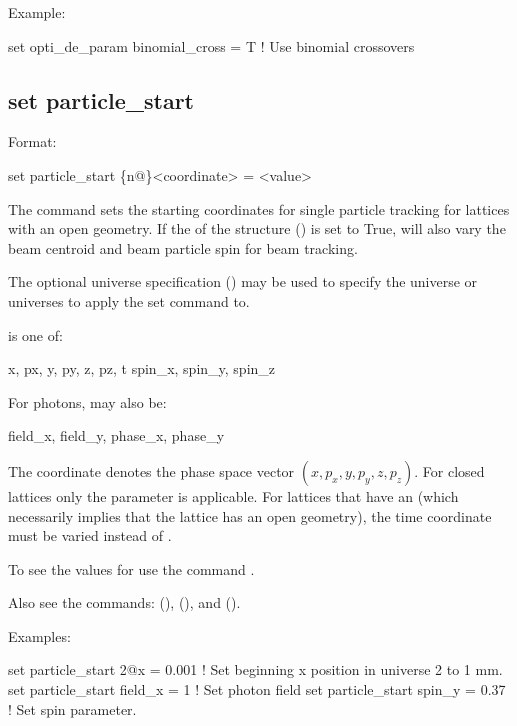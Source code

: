 {{Example:
\begin{example}
  set opti_de_param binomial_cross = T  ! Use binomial crossovers 
\end{example}


\subsection{set particle_start}
\label{s:set.particle.start}

Format:
\begin{example}
  set particle_start \{n@\}<coordinate> = <value>
\end{example}
The  command sets the starting coordinates for single particle tracking for
lattices with an open geometry. If the  of the 
structure () is set to True,  will also vary the beam centroid
and beam particle spin for beam tracking.

The optional  universe specification () may be used to specify the universe
or universes to apply the set command to.

 is one of:
\begin{example}
  x, px, y, py, z, pz, t
  spin_x, spin_y, spin_z
\end{example}
For photons,  may also be:
\begin{example}
  field_x, field_y, phase_x, phase_y
\end{example}
The \vn{*} coordinate denotes the phase space vector $(x, p_x, y, p_y, z, p_z)$.  For closed
lattices only the  parameter is applicable. For lattices that have an  (which
necessarily implies that the lattice has an open geometry), the time  coordinate must be
varied instead of .

To see the values for  use the command .

Also see the commands:  (),  (), 
and  ().

Examples:
\begin{example}
  set particle_start 2@x = 0.001         ! Set beginning x position in universe 2 to 1 mm.
  set particle_start field_x = 1         ! Set photon field
  set particle_start spin_y = 0.37       ! Set spin parameter.
\end{example}

}}
